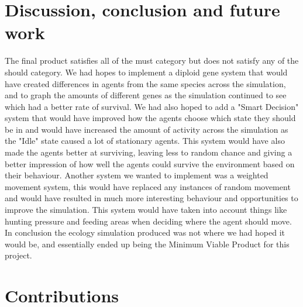 \documentclass[a4paper, oneside, 11pt]{report}
\begin{document}
\chapter{Discussion, conclusion and future work}
	The final product satisfies all of the must category but does not satisfy any of the should category. We had hopes to implement a diploid gene system that would have created differences in agents from the same species across the simulation, and to graph the amounts of different genes as the simulation continued to see which had a better rate of survival. We had also hoped to add a "Smart Decision" system that would have improved how the agents choose which state they should be in and would have increased the amount of activity across the simulation as the "Idle" state caused a lot of stationary agents. This system would have also made the agents better at surviving, leaving less to random chance and giving a better impression of how well the agents could survive the environment based on their behaviour. Another system we wanted to implement was a weighted movement system, this would have replaced any instances of random movement and would have resulted in much more interesting behaviour and opportunities to improve the simulation. This system would have taken into account things like hunting pressure and feeding areas when deciding where the agent should move. In conclusion the ecology simulation produced was not where we had hoped it would be, and essentially ended up being the Minimum Viable Product for this project. 





\chapter*{Contributions}
\end{document}

